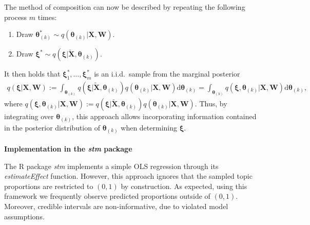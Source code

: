 The method of composition can now be described by repeating the following process $m$ times:
\begin{enumerate}
\item Draw $\boldsymbol{\theta}_{(k)}^* \sim q(\boldsymbol{\theta}_{(k)} | \boldsymbol{X}, \boldsymbol{W})$.
\item Draw $\boldsymbol{\xi}^* \sim q(\boldsymbol{\xi} | \tilde{\boldsymbol{X}}, \boldsymbol{\theta}_{(k)})$.
\end{enumerate}
It then holds that $\boldsymbol{\xi}_1^*, \dots, \boldsymbol{\xi}_m^*$ is an i.i.d.\ sample from the marginal posterior
\begin{align*}
q(\boldsymbol{\xi} | \boldsymbol{X}, \boldsymbol{W}) := \int_{\boldsymbol{\theta}_{(k)}} q(\boldsymbol{\xi} | \tilde{\boldsymbol{X}}, \boldsymbol{\theta}_{(k)}) q(\boldsymbol{\theta}_{(k)} | \boldsymbol{X}, \boldsymbol{W}) \text{d} \boldsymbol{\theta}_{(k)} = \int_{\boldsymbol{\theta}_{(k)}} q(\boldsymbol{\xi}, \boldsymbol{\theta}_{(k)} | \boldsymbol{X}, \boldsymbol{W}) \text{d} \boldsymbol{\theta}_{(k)}, 
\end{align*}
where $q(\boldsymbol{\xi}, \boldsymbol{\theta}_{(k)} | \boldsymbol{X}, \boldsymbol{W}) := q(\boldsymbol{\xi}| \tilde{\boldsymbol{X}}, \boldsymbol{\theta}_{(k)}) q(\boldsymbol{\theta}_{(k)} | \boldsymbol{X}, \boldsymbol{W})$. Thus, by integrating over $\boldsymbol{\theta}_{(k)}$, this approach allows incorporating information contained in the posterior distribution of $\boldsymbol{\theta}_{(k)}$ when determining $\boldsymbol{\xi}$.\\
\\
\textbf{Implementation in the \textit{stm} package} \vspace{10px}

\noindent The R package \textit{stm} implements a simple OLS regression through its \textit{estimateEffect} function. However, this approach ignores that the sampled topic proportions are restricted to $(0,1)$ by construction. As expected, using this framework we frequently observe predicted proportions outside of $(0,1)$. Moreover, credible intervals are non-informative, due to violated model assumptions. \\

